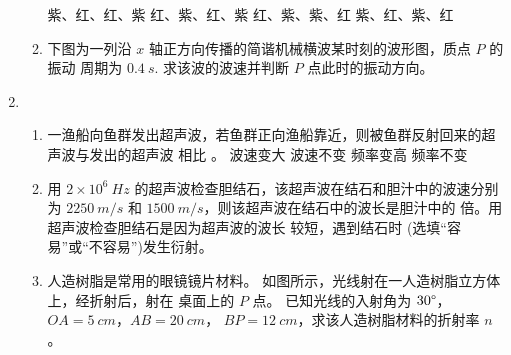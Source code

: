 \begin{enumerate}
\begin{enumerate}
\fourchoices
{紫、红、红、紫}
{红、紫、红、紫}
{红、紫、紫、红}
{紫、红、紫、红}



\item 
下图为一列沿 $ x $ 轴正方向传播的简谐机械横波某时刻的波形图，质点 $ P $ 的振动
周期为 $ 0.4 \ s $. 求该波的波速并判断 $ P $ 点此时的振动方向。
\begin{figure}[h!]
	\flushright
	
\end{figure}




\end{enumerate}


\item 
{}
\begin{enumerate}
	\item
一渔船向鱼群发出超声波，若鱼群正向渔船靠近，则被鱼群反射回来的超声波与发出的超声波
相比  \underlinegap 。
\fourchoices
{波速变大}
{波速不变}
{频率变高}
{频率不变}




\item 
用 $ 2 \times 10^{6} \ Hz $ 的超声波检查胆结石，该超声波在结石和胆汁中的波速分别为 $ 2250 \ m /s $ 和 $ 1500 \ m/s $，则该超声波在结石中的波长是胆汁中的 \underlinegap 倍。用超声波检查胆结石是因为超声波的波长
较短，遇到结石时  \underlinegap (选填“容易”或“不容易”)发生衍射。



\item 
人造树脂是常用的眼镜镜片材料。 如图所示，光线射在一人造树脂立方体上，经折射后，射在
桌面上的 $ P $ 点。 已知光线的入射角为 $ 30 \degree $，$ OA=5 \ cm $，$ AB=20 \ cm $，
$ BP=12 \ cm $，求该人造树脂材料的折射率 $ n $。
\begin{figure}[h!]
	\flushright
	
\end{figure}


	
\end{enumerate}



\end{enumerate}
